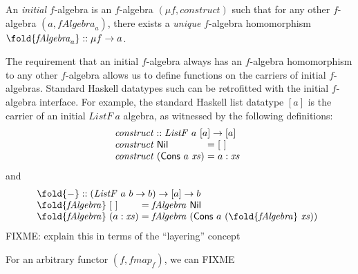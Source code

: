 \begin{definition}
  An \emph{initial} $f$-algebra is an $f$-algebra $(\mu f,
  \mathit{construct})$ such that for any other $f$-algebra $(a,
  \mathit{fAlgebra}_a)$, there exists a \emph{unique} $f$-algebra
  homomorphism $\fold{\mathit{fAlgebra}_a} :: \mu f \to a$.
\end{definition}

The requirement that an initial $f$-algebra always has an $f$-algebra
homomorphism to any other $f$-algebra allows us to define functions on
the carriers of initial $f$-algebras. Standard Haskell datatypes such
can be retrofitted with the initial $f$-algebra interface. For
example, the standard Haskell list datatype $[a]$ is the carrier of an
initial $\mathit{ListF}~a$ algebra, as witnessed by the following
definitions:
\begin{displaymath}
  \begin{array}{l}
    \mathit{construct} :: \mathit{ListF}~a~[a] \to [a] \\
    \begin{array}{@{}l@{\hspace{0.3em}}l@{\hspace{0.3em}}c@{\hspace{0.3em}}l}
      \mathit{construct}&\mathsf{Nil} &=& [~] \\
      \mathit{construct}&(\mathsf{Cons}~a~\mathit{xs}) &=& a : \mathit{xs}
    \end{array}
  \end{array}
\end{displaymath}
and
\begin{displaymath}
  \begin{array}{l}
    \fold{-} :: (\mathit{ListF}~a~b \to b) \to [a] \to b \\
    \begin{array}{@{}l@{\hspace{0.3em}}l@{\hspace{0.3em}}c@{\hspace{0.3em}}l}
      \fold{\mathit{fAlgebra}}&[~]&=&\mathit{fAlgebra}~\mathsf{Nil} \\
      \fold{\mathit{fAlgebra}}&(a : \mathit{xs})&=&\mathit{fAlgebra}~(\mathsf{Cons}~a~(\fold{\mathit{fAlgebra}}~\mathit{xs}))
    \end{array}
  \end{array}
\end{displaymath}
FIXME: explain this in terms of the ``layering'' concept

For an arbitrary functor $(f, \mathit{fmap}_f)$, we can FIXME

